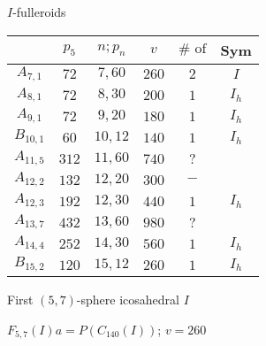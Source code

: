 \documentclass[%
pdf,
colorBG,
slideColor,
]{prosper}
\begin{document}
\begin{slide}{$I$-fulleroids}
{\scriptsize
\begin{center}
\begin{tabular}{|c|c|c|c|c|c|}
\hline
     & $p_5$ & $n; p_n$  & $v$ & $\#\mbox{~of}$ & Sym\\
\hline
$A_{7,1}$ & $72$ & $7,60$ & $260$ & $2$  & $I$\\
$A_{8,1}$ & $72$ & $8,30$ & $200$ & $1$  & $I_h$\\
$A_{9,1}$ & $72$ & $9,20$ & $180$ & $1$  & $I_h$\\
$B_{10,1}$ & $60$ & $10,12$ & $140$ & $1$  & $I_h$\\
$A_{11,5}$ & $312$ & $11,60$ & $740$ & $?$  &\\
$A_{12,2}$ & $132$ & $12,20$ & $300$ & $-$  &\\
$A_{12,3}$ & $192$ & $12,30$ & $440$ & $1$  &$I_h$\\
$A_{13,7}$ & $432$ & $13,60$ & $980$ & $?$  &\\
$A_{14,4}$ & $252$ & $14,30$ & $560$ & $1$  &$I_h$\\
$B_{15,2}$ & $120$ & $15,12$ & $260$ & $1$  &$I_h$\\
\hline
\end{tabular}
\end{center}
}
\end{slide}


\begin{slide}{First $(5,7)$-sphere icosahedral $I$}
\begin{center}
\begin{minipage}{5.5cm}
\centering
{}\par
\end{minipage}
\hspace{0.1cm}
\begin{minipage}{5.5cm}
\centering
{}\par
\end{minipage}
\end{center}
\begin{center}
$F_{5,7}(I)a = P(C_{140}(I))$; $v=260$
\end{center}
\end{slide}
\end{document}
